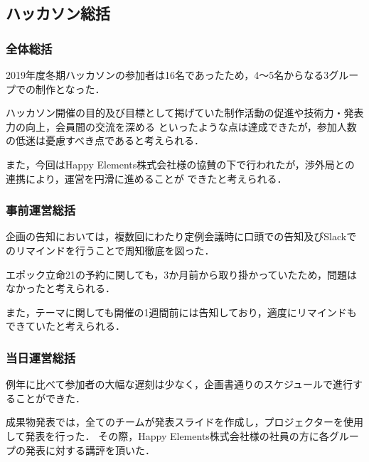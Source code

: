 \subsection*{ハッカソン総括}


\subsubsection*{全体総括}

2019年度冬期ハッカソンの参加者は16名であったため，4〜5名からなる3グループでの制作となった．

ハッカソン開催の目的及び目標として掲げていた制作活動の促進や技術力・発表力の向上，会員間の交流を深める
といったような点は達成できたが，参加人数の低迷は憂慮すべき点であると考えられる．

また，今回はHappy Elements株式会社様の協賛の下で行われたが，渉外局との連携により，運営を円滑に進めることが
できたと考えられる．

\subsubsection*{事前運営総括}

企画の告知においては，複数回にわたり定例会議時に口頭での告知及びSlackでのリマインドを行うことで周知徹底を図った．

エポック立命21の予約に関しても，3か月前から取り掛かっていたため，問題はなかったと考えられる．

また，テーマに関しても開催の1週間前には告知しており，適度にリマインドもできていたと考えられる．

\subsubsection*{当日運営総括}

例年に比べて参加者の大幅な遅刻は少なく，企画書通りのスケジュールで進行することができた．

成果物発表では，全てのチームが発表スライドを作成し，プロジェクターを使用して発表を行った．
その際，Happy Elements株式会社様の社員の方に各グループの発表に対する講評を頂いた．

